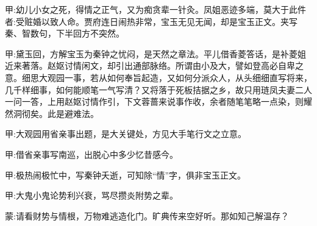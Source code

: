 
\begin{parag}
    \begin{note}甲:幼儿小女之死，得情之正气，又为痴贪辈一针灸。凤姐恶迹多端，莫大于此件者:受赃婚以致人命。贾府连日闹热非常，宝玉无见无闻，却是宝玉正文。夹写秦、智数句，下半回方不突然。\end{note}
\end{parag}


\begin{parag}
    \begin{note}甲:黛玉回，方解宝玉为秦钟之忧闷，是天然之章法。平儿借香菱答话，是补菱姐近来著落。赵妪讨情闲文，却引出通部脉络。所谓由小及大，譬如登高必自卑之意。细思大观园一事，若从如何奉旨起造，又如何分派众人，从头细细直写将来，几千样细事，如何能顺笔一气写清？又将落于死板拮据之乡，故只用琏凤夫妻二人一问一答，上用赵妪讨情作引，下文蓉蔷来说事作收，余者随笔笔略一点染，则耀然洞彻矣。此是避难法。\end{note}
\end{parag}


\begin{parag}
    \begin{note}甲:大观园用省亲事出题，是大关键处，方见大手笔行文之立意。\end{note}
\end{parag}


\begin{parag}
    \begin{note}甲:借省亲事写南巡，出脱心中多少忆昔感今。\end{note}
\end{parag}


\begin{parag}
    \begin{note}甲:极热闹极忙中，写秦钟夭逝，可知除“情”字，俱非宝玉正文。\end{note}
\end{parag}


\begin{parag}
    \begin{note}甲:大鬼小鬼论势利兴衰，骂尽攒炎附势之辈。\end{note}
\end{parag}


\begin{parag}
    \begin{note}蒙:请看财势与情根，万物难逃造化门。旷典传来空好听。那如知己解温存？\end{note}
\end{parag}


